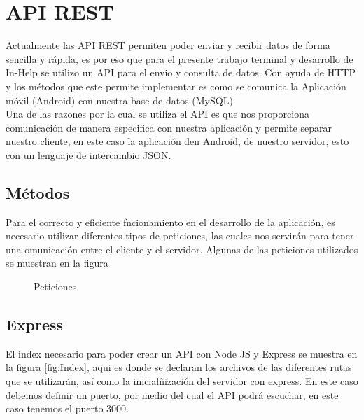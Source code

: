 
\section{API REST}
Actualmente las API REST permiten poder enviar y recibir datos de forma sencilla y rápida, es por eso que para el presente trabajo terminal y desarrollo de In-Help se utilizo un API para el envio y consulta de datos. Con ayuda de HTTP y los métodos que este permite implementar es como se comunica la Aplicación móvil (Android) con nuestra base de datos (MySQL).\\


Una de las razones por la cual se utiliza el API es que nos proporciona comunicación de manera especifica con nuestra aplicación y permite separar nuestro cliente, en este caso la aplicación den Android, de nuestro servidor, esto con un lenguaje de intercambio JSON.

\subsection{Métodos}
Para el correcto y eficiente fncionamiento en el desarrollo de la aplicación, es necesario utilizar diferentes tipos de peticiones, las cuales nos servirán para tener una omunicación entre el cliente y el servidor. Algunas de las peticiones utilizados se muestran en la figura 
\begin{figure}[htbp!]
	\centering
	\caption{Peticiones}
	\label{fig:API_Peticion}
\end{figure}

 \subsection{Express}
 El index necesario para poder crear un API con Node JS y Express se muestra en la figura \ref{fig:Index}, aqui es donde se declaran los archivos de las diferentes rutas que se utilizarán, así como la inicialñización del servidor con express. En este caso debemos definir un puerto, por medio del cual el API podrá escuchar, en este caso tenemos el puerto 3000.
 
